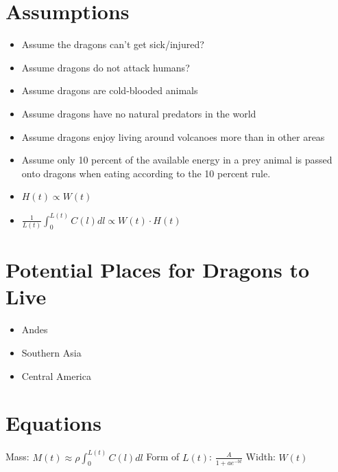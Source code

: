 \documentclass{article}
\begin{document}
\section{Assumptions}
\begin{itemize}
\item Assume the dragons can't get sick/injured?
\item Assume dragons do not attack humans?
\item Assume dragons are cold-blooded animals
\item Assume dragons have no natural predators in the world
\item Assume dragons enjoy living around volcanoes more than in other areas
\item Assume only 10 percent of the available energy in a prey animal is passed onto dragons when eating according to the 10 percent rule.
\item $H(t)\propto W(t)$
\item $\frac{1}{L(t)}\int_0^{L(t)}C(l)dl\propto W(t)\cdot H(t)$
\end{itemize}

\section{Potential Places for Dragons to Live}
\begin{itemize}
\item Andes
\item Southern Asia
\item Central America
\end{itemize}

\section{Equations}
Mass: $M(t)\approx \rho\int_0^{L(t)}C(l)dl$
Form of $L(t)$: $\frac{A}{1+ae^{-bt}}$
Width: $W(t)$
\end{document}
